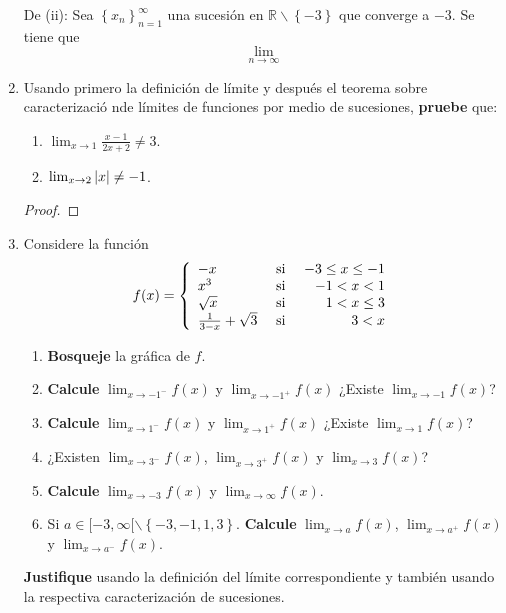\documentclass[12pt]{article}
\begin{document}
\begin{enumerate}
\begin{sol}
        De (ii): Sea $\left\{x_n\right\}_{ n=1}^\infty$ una sucesión en $\mathbb{R}\backslash\left\{-3\right\}$ que converge a $-3$. Se tiene que
        \begin{equation*}
            \lim_{ n\rightarrow\infty}
        \end{equation*}
    \end{sol}

    \item Usando primero la definición de límite y después el teorema sobre caracterizació nde límites de funciones por medio de sucesiones, \textbf{pruebe} que:
    \begin{enumerate}
        \item $\lim_{x\rightarrow1}\frac{x-1}{2x+2}\neq 3$.
        \item $\lim_{x\rightarrow 2}\left| x \right|\neq -1$.
    \end{enumerate}

    \begin{proof}
    \end{proof}

    \item Considere la función
    \begin{equation*}
        f(x)=\left\{
            \begin{array}{lcr}
                -x & \textup{ si } & -3\leq x\leq-1\\
                x^3 & \textup{ si } & -1< x<1\\
                \sqrt{x} & \textup{ si } & 1<x\leq3 \\
                \frac{1}{3-x}+\sqrt{3} & \textup{ si } & 3<x\\ 
            \end{array}
        \right.
    \end{equation*}
    \begin{enumerate}
        \item \textbf{Bosqueje} la gráfica de $f$.
        \item \textbf{Calcule} $\lim_{x \rightarrow-1^-}f(x)$ y $\lim_{x \rightarrow-1^+}f(x)$ ¿Existe $\lim_{x \rightarrow-1}f(x)$?
        \item \textbf{Calcule} $\lim_{x \rightarrow1^-}f(x)$ y $\lim_{x \rightarrow1^+}f(x)$ ¿Existe $\lim_{x \rightarrow1}f(x)$?
        \item ¿Existen $\lim_{x \rightarrow3^-}f(x)$, $\lim_{x \rightarrow3^+}f(x)$ y $\lim_{x \rightarrow3}f(x)$?
        \item \textbf{Calcule} $\lim_{x \rightarrow-3}f(x)$ y $\lim_{x \rightarrow\infty}f(x)$.
        \item Si $a\in[-3,\infty[\backslash\left\{-3,-1,1,3 \right\}$. \textbf{Calcule} $\lim_{ x\rightarrow a}f(x)$, $\lim_{ x\rightarrow a^+}f(x)$ y $\lim_{ x\rightarrow a^-}f(x)$.
    \end{enumerate}
    \textbf{Justifique} usando la definición del límite correspondiente y también usando la respectiva caracterización de sucesiones.


\end{enumerate}
\end{document}
